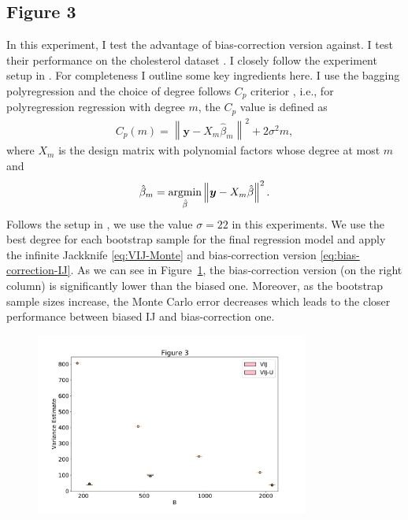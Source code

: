 \documentclass[11pt]{article}
\begin{document}
\subsection{Figure 3}
In this experiment, I test the advantage of bias-correction version against.
I test their performance on the cholesterol dataset \cite{efron1991compliance}.
I closely follow the experiment setup in \cite{efron2012model}.
For completeness I outline some key ingredients here.
I use the bagging polyregression and the choice of degree follows $C_p$ criterior \cite{mallows2000some}, i.e., for polyregression regression with degree $m$, the $C_p$ value is defined as
\begin{align*}
	C_{p}(m)=\left\|\boldsymbol{y}-X_{m} \hat{\beta}_{m}\right\|^{2}+2 \sigma^{2} m,
\end{align*}
where $X_m$ is the design matrix with polynomial factors whose degree at most $m$ and 
$$
\hat{\beta}_m = \operatornamewithlimits{argmin}_{\hat{\beta}}\left\|\boldsymbol{y}-X_{m} \hat{\beta}\right\|^{2}.
$$
Follows the setup in \cite{efron2012model}, we use the value $\sigma=22$ in this experiments.
We use the best degree for each bootstrap sample for the final regression model and apply the infinite Jackknife \ref{eq:VIJ-Monte} and bias-correction version \ref{eq:bias-correction-IJ}.
As we can see in Figure~\ref{fig:figure_3}, the bias-correction version (on the right column) is significantly lower than the biased one.
Moreover, as the bootstrap sample sizes increase, the Monte Carlo error decreases which leads to the closer performance between biased IJ and bias-correction one.
\begin{figure}[htbp]
	\label{fig:figure_3}
	\centering
	\includegraphics[width=0.8\textwidth]{../figures/figure_3.pdf}
\end{figure}
\end{document}
